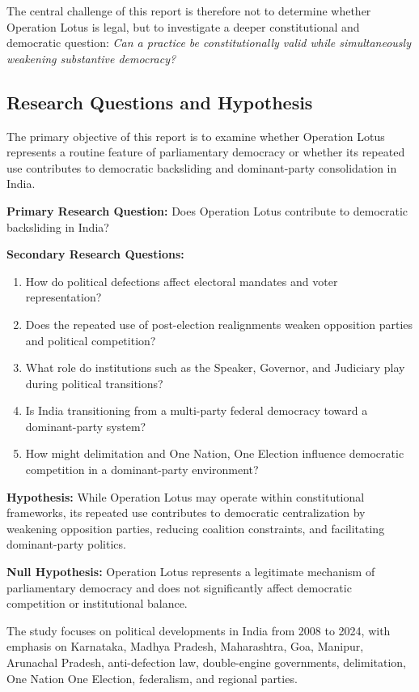 \documentclass[11pt]{article}
\begin{document}
The central challenge of this report is therefore not to determine whether Operation Lotus is legal, but to investigate a deeper constitutional and democratic question: \emph{Can a practice be constitutionally valid while simultaneously weakening substantive democracy?}

\subsection{Research Questions and Hypothesis}
The primary objective of this report is to examine whether Operation Lotus represents a routine feature of parliamentary democracy or whether its repeated use contributes to democratic backsliding and dominant-party consolidation in India.

\textbf{Primary Research Question:} Does Operation Lotus contribute to democratic backsliding in India?

\textbf{Secondary Research Questions:}
\begin{enumerate}
\item How do political defections affect electoral mandates and voter representation?
\item Does the repeated use of post-election realignments weaken opposition parties and political competition?
\item What role do institutions such as the Speaker, Governor, and Judiciary play during political transitions?
\item Is India transitioning from a multi-party federal democracy toward a dominant-party system?
\item How might delimitation and One Nation, One Election influence democratic competition in a dominant-party environment?
\end{enumerate}

\textbf{Hypothesis:} While Operation Lotus may operate within constitutional frameworks, its repeated use contributes to democratic centralization by weakening opposition parties, reducing coalition constraints, and facilitating dominant-party politics.

\textbf{Null Hypothesis:} Operation Lotus represents a legitimate mechanism of parliamentary democracy and does not significantly affect democratic competition or institutional balance.

The study focuses on political developments in India from 2008 to 2024, with emphasis on Karnataka, Madhya Pradesh, Maharashtra, Goa, Manipur, Arunachal Pradesh, anti-defection law, double-engine governments, delimitation, One Nation One Election, federalism, and regional parties.
\end{document}
